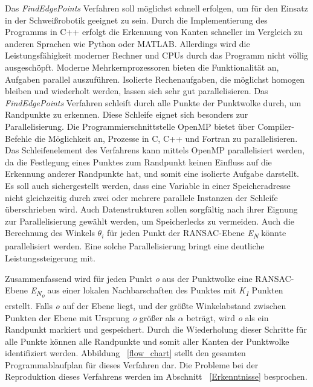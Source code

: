 Das \textit{FindEdgePoints} Verfahren soll möglichst schnell erfolgen, um für den Einsatz in der Schweißrobotik geeignet zu sein. Durch die Implementierung des Programms in C++ erfolgt die Erkennung von Kanten schneller im Vergleich zu anderen Sprachen wie Python oder MATLAB. Allerdings wird die Leistungsfähigkeit moderner Rechner und CPUs durch das Programm nicht völlig ausgeschöpft. Moderne Mehrkernprozessoren bieten die Funktionalität an, Aufgaben parallel auszuführen. Isolierte Rechenaufgaben, die möglichst homogen bleiben und wiederholt werden, lassen sich sehr gut parallelisieren. Das \textit{FindEdgePoints} Verfahren schleift durch alle Punkte der Punktwolke durch, um Randpunkte zu erkennen. Diese Schleife eignet sich besonders zur Parallelisierung. Die Programmierschnittstelle OpenMP bietet über Compiler-Befehle die Möglichkeit an, Prozesse in C, C++ und Fortran zu parallelisieren. Das Schleifenelement des Verfahrens kann mittels OpenMP parallelisiert werden, da die Festlegung eines Punktes zum Randpunkt keinen Einfluss auf die Erkennung anderer Randpunkte hat, und somit eine isolierte Aufgabe darstellt. Es soll auch sichergestellt werden, dass eine Variable in einer Speicheradresse nicht gleichzeitig durch zwei oder mehrere parallele Instanzen der Schleife überschrieben wird. Auch Datenstrukturen sollen sorgfältig nach ihrer Eignung zur Parallelisierung gewählt werden, um Speicherlecks zu vermeiden. Auch die Berechnung des Winkels $\theta_i$ für jeden Punkt der RANSAC-Ebene \textit{E\textsubscript{N}} könnte parallelisiert werden. Eine solche Parallelisierung bringt eine deutliche Leistungssteigerung mit. 

Zusammenfassend wird für jeden Punkt \textit{o} aus der Punktwolke eine RANSAC-Ebene \textit{E\textsubscript{N\textsubscript{o}}} aus einer lokalen Nachbarschaften des Punktes mit \textit{K\textsubscript{1}} Punkten erstellt. Falls \textit{o} auf der Ebene liegt, und der größte Winkelabstand zwischen Punkten der Ebene mit Ursprung \textit{o} größer als $\alpha$ beträgt, wird \textit{o} als ein Randpunkt markiert und gespeichert. Durch die Wiederholung dieser Schritte für alle Punkte können alle Randpunkte und somit aller Kanten der Punktwolke identifiziert werden. Abbildung ~\ref{flow_chart} stellt den gesamten Programmablaufplan für dieses Verfahren dar. Die Probleme bei der Reproduktion dieses Verfahrens werden im Abschnitt ~\ref{Erkenntnisse} besprochen.


